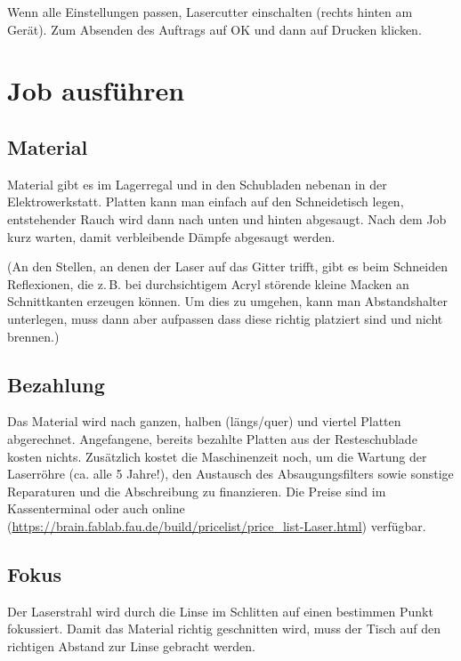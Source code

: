 \documentclass{\basedir/fablab-document}
\begin{document}


	Wenn alle Einstellungen passen, Lasercutter einschalten (rechts hinten am Gerät). Zum Absenden des Auftrags auf OK und dann auf Drucken klicken.

	\section{Job ausführen}

	\subsection{Material}
	Material gibt es im Lagerregal und in den Schubladen nebenan in der Elektrowerkstatt. Platten kann man einfach auf den Schneidetisch legen, entstehender Rauch wird dann nach unten und hinten abgesaugt. Nach dem Job kurz warten, damit verbleibende Dämpfe abgesaugt werden.

	(An den Stellen, an denen der Laser auf das Gitter trifft, gibt es beim Schneiden Reflexionen, die z.\,B. bei durchsichtigem Acryl störende kleine Macken an Schnittkanten erzeugen können. Um dies zu umgehen, kann man Abstandshalter unterlegen, muss dann aber aufpassen dass diese richtig platziert sind und nicht brennen.)

	\subsection{Bezahlung}
	\label{sec:bezahlung}
	Das Material wird nach ganzen, halben (längs/quer) und viertel Platten abgerechnet. Angefangene, bereits bezahlte Platten aus der Resteschublade kosten nichts. Zusätzlich kostet die Maschinen\-zeit noch, um die Wartung der Laser\-röhre (ca.  alle 5 Jahre!), den Austausch des Absaugungsfilters sowie sonstige Reparaturen und die Abschreibung zu finan\-zieren.
	Die Preise sind im Kassenterminal oder auch online (\url{https://brain.fablab.fau.de/build/pricelist/price_list-Laser.html}) verfügbar.

	\subsection{Fokus} \label{fokus}
	Der Laserstrahl wird durch die Linse im Schlitten auf einen bestimmen Punkt fokussiert. Damit das Material richtig geschnitten wird, muss der Tisch auf den richtigen Abstand zur Linse gebracht werden.
\end{document}

